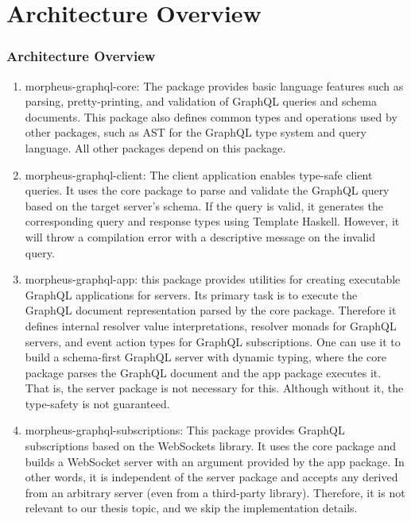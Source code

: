 \section{Architecture Overview}

\begin{frame}\frametitle{Architecture Overview}

\begin{enumerate} 
  \item morpheus-graphql-core: The package provides basic language features such as parsing, pretty-printing, and validation of GraphQL queries and schema documents. This package also defines common types and operations used by other packages, such as AST for the GraphQL type system and query language. All other packages depend on this package.

  \item morpheus-graphql-client: The client application enables type-safe client queries. It uses the core package to parse and validate the GraphQL query based on the target server's schema. 
  If the query is valid, it generates the corresponding query and response types using Template Haskell. However, it will throw a compilation error with a   descriptive message on the invalid query.
    
  \item morpheus-graphql-app: this package provides utilities for creating executable GraphQL applications for servers.  Its primary task is to execute the 
  GraphQL document representation parsed by the core package. 
  Therefore it defines internal resolver value interpretations, resolver monads for GraphQL servers, and event action types for GraphQL 
  subscriptions. One can use it to build a schema-first GraphQL server 
  with dynamic typing, where the core package parses 
  the GraphQL document and the app package executes it. 
  That is, the server package is not necessary for this. 
  Although without it, the type-safety is not guaranteed. 
  
  \item morpheus-graphql-subscriptions: This package provides GraphQL subscriptions based on the WebSockets library. 
  It uses the core package and builds a WebSocket server 
  with an  argument provided by the app package. 
  In other words, it is independent of the server package and 
  accepts any  derived from an arbitrary server 
  (even from a third-party library). Therefore, it is not relevant to our thesis topic, and we skip the implementation details.


\end{enumerate}
\end{frame}
